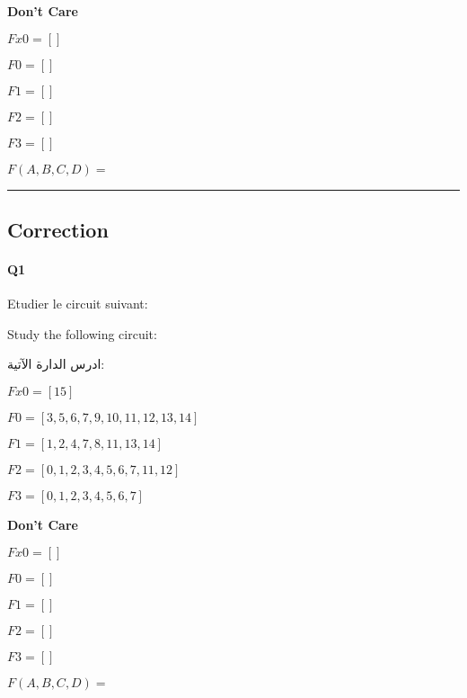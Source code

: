 \textbf{Don't Care }
 
$Fx0 = []$

$F0 = []$

$F1 = []$

$F2 = []$

$F3 = []$



$F(A,B,C,D) =$



 






\hrule width 1\linewidth
\pagebreak

\subsection{Correction}


\paragraph{Q1}



Etudier le circuit suivant:



Study the following circuit:

\begin{arab}[utf]
ادرس الدارة الآتية:
\end{arab}

 

$Fx0 = [15]$



$F0 = [3, 5, 6, 7, 9, 10, 11, 12, 13, 14]$



$F1 = [1, 2, 4, 7, 8, 11, 13, 14]$



$F2 = [0, 1, 2, 3, 4, 5, 6, 7, 11, 12]$



$F3 = [0, 1, 2, 3, 4, 5, 6, 7]$



\textbf{Don't Care }
 
$Fx0 = []$

$F0 = []$

$F1 = []$

$F2 = []$

$F3 = []$



$F(A,B,C,D) =$







